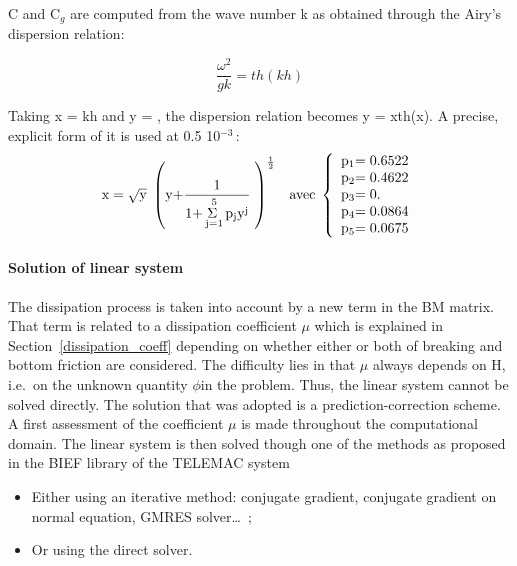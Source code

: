 C and C${}_{g}$ are computed from the wave number k as obtained through the
Airy's dispersion relation:

\begin{equation}
  \frac{\omega^2}{gk} = th(kh)
  \label{eq:3.79}
\end{equation}

Taking x = kh and y = , the dispersion relation becomes y = xth(x). A precise, explicit form of it is used at 0.5 10${}^{-3\ }$:
\begin{equation} \label{GrindEQ__3_80_}
{\rm x}=\sqrt{{\rm y}} {\rm \; }\left({\rm y+}\frac{{\rm 1}}{{\rm 1+}\mathop{{\rm \Sigma \; }}\limits_{{\rm j=1}}^{{\rm 5}} {\rm p}_{{\rm j}} {\rm y}^{{\rm j}} } {\rm \; }\right)^{\frac{{\rm 1}}{{\rm 2}} } {\rm \; \; \; avec\; }\left\{\begin{array}{l} {{\rm p}_{{\rm 1}} {\rm =0.6522}} \\ {{\rm p}_{{\rm 2}} {\rm =0.4622}} \\ {{\rm p}_{{\rm 3}} {\rm =0.}} \\ {{\rm p}_{{\rm 4}} {\rm =0.0864}} \\ {{\rm p}_{{\rm 5}} {\rm =0.0675}} \end{array}\right.
\end{equation}


\paragraph{Solution of linear system}

The dissipation process is taken into account by a new term in the BM matrix.
That term is related to a dissipation coefficient $\mu$ which is explained in
Section~\ref{dissipation_coeff} depending on whether either or both of
breaking and bottom friction are considered. The difficulty lies in that $\mu$
always depends on H, i.e.\ on the unknown quantity $\phi$in the problem. Thus,
the linear system cannot be solved directly. The solution that was adopted is a
prediction-correction scheme. A first assessment of the coefficient $\mu$ is
made throughout the computational domain. The linear system is then solved
though one of the methods as proposed in the BIEF library of the TELEMAC system

\begin{itemize}
\item  Either using an iterative method: conjugate gradient, conjugate gradient
  on normal equation, GMRES solver\ldots~\cite{Hervouet2006};

\item  Or using the direct solver.
\end{itemize}

